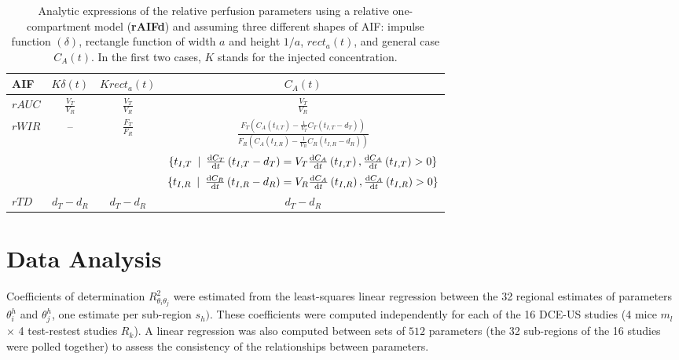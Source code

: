 \begin{table}[!h]
\begin{center}
\begin{tabular}{lccc}
\toprule
AIF & \textbf{$K\delta\left(t\right)$} & $K rect_a\left(t\right)$ & $C_A \left(t\right)$ \\
\midrule
\textbf{$rAUC$} & $\frac{V_T}{V_R}$ & $\frac{V_T}{V_R}$ & $\frac{V_T}{V_R}$\\
\midrule
\multirow{3}{*}{\textbf{$rWIR$}} &  \multirow{3}{*}{--} & \multirow{3}{*}{{$\frac{F_T}{F_R}$}} & $\frac{F_T\left(C_A\left(t_{I,T}\right)-\frac{1}{V_T}C_T\left(t_{I,T} - d_T\right)\right)}{F_R\left(C_A\left(t_{I,R}\right)-\frac{1}{V_R}C_R\left(t_{I,R} - d_R\right)\right)}$ \\
&  & & $\{ t_{I,T} \enskip\vert\enskip \frac{\mathrm d C_T}{\mathrm dt}\left(t_{I,T} - d_T\right) = V_T \frac{\mathrm d C_A}{\mathrm dt}\left(t_{I,T}\right), \frac{\mathrm d C_A}{\mathrm d t}\left(t_{I,T}\right) > 0\}$ \\
&  & & $\{ t_{I,R} \enskip\vert\enskip \frac{\mathrm d C_R}{\mathrm dt}\left(t_{I,R} - d_R\right) = V_R \frac{\mathrm d C_A}{\mathrm dt}\left(t_{I,R}\right), \frac{\mathrm d C_A}{\mathrm d t}\left(t_{I,R}\right) > 0\}$ \\
\midrule
$rTD$ & $d_T - d_R$ & $d_T - d_R$ & $d_T - d_R$ \\
\bottomrule
\end{tabular}
\caption{Analytic expressions of the relative perfusion parameters using a relative one-compartment model (\textbf{rAIFd}) and assuming three different shapes of AIF: impulse  function $(\delta)$, rectangle function of width $a$ and height $1/a$, $rect_a(t)$, and general case $C_A(t)$. In the first two cases, $K$ stands for the injected concentration.}
\label{tab:AnalyticRelationRelative}
\end{center}
\end{table}

\section{Data Analysis}
Coefficients of determination $R^2_{\theta_{i}\theta_{j}}$ were estimated from the least-squares linear regression between the 32 regional estimates of parameters $\theta_{i}^{h}$ and $\theta_{j}^{h}$, one estimate per sub-region $s_{h})$. These coefficients were computed independently for each of the 16 DCE-US studies (4 mice $m_{l}$ $\times$ 4 test-restest studies $R_{k}$). A linear regression was also computed between sets of $512$ parameters (the 32 sub-regions of the 16 studies were polled together) to assess the consistency of the relationships between parameters. 

